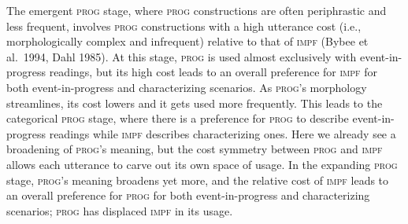 \documentclass[12pt]{article}
\newcommand{\gcs}[1]{\textcolor{blue}{[gcs: #1]}}
\begin{document}
The emergent \textsc{prog} stage, where \textsc{prog} constructions are often periphrastic and less frequent, involves \textsc{prog} constructions with a high utterance cost (i.e., morphologically complex and infrequent) relative to that of \textsc{impf} (Bybee et al.~1994, Dahl 1985). %
At this stage, \textsc{prog} is used almost exclusively with event-in-progress readings, but its high cost leads to an overall preference for \textsc{impf} for both event-in-progress and characterizing scenarios. As \textsc{prog}'s morphology streamlines, its cost lowers and it gets used more frequently. This leads to the categorical \textsc{prog} stage, where there is a preference for \textsc{prog} to describe event-in-progress readings while \textsc{impf} describes characterizing ones. Here we already see a broadening of \textsc{prog}'s meaning, but the cost symmetry between \textsc{prog} and \textsc{impf} allows each utterance to carve out its own space of usage. 
In the expanding \textsc{prog} stage, \textsc{prog}'s meaning broadens yet more, and the relative cost of \textsc{impf} leads to an overall preference for \textsc{prog} for both event-in-progress and characterizing scenarios; \textsc{prog} has displaced \textsc{impf} in its usage.
\end{document}
